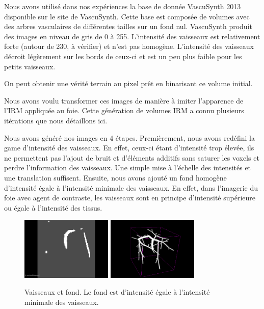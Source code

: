 Nous avons utilisé dans nos expériences la base de donnée VascuSynth 2013 disponible sur le site de VascuSynth. Cette base est composée de volumes avec des arbres vasculaires de différentes tailles sur un fond nul. VascuSynth produit des images en niveau de gris de 0 à 255. L'intensité des vaisseaux est relativement forte (autour de 230, à vérifier) et n'est pas homogène. L'intensité des vaisseaux décroit légèrement sur les bords de ceux-ci et est un peu plus faible pour les petits vaisseaux.

On peut obtenir une vérité terrain au pixel prêt en binarisant ce volume initial.

Nous avons voulu transformer ces images de manière à imiter l'apparence de l'IRM appliquée au foie. Cette génération de volumes IRM a connu plusieurs itérations que nous détaillons ici.

Nous avons généré nos images en 4 étapes.
Premièrement, nous avons redéfini la game d'intensité des vaisseaux. En effet, ceux-ci étant d'intensité trop élevée, ils ne permettent pas l'ajout de bruit et d'éléments additifs sans saturer les voxels et perdre l'information des vaisseaux. Une simple mise à l'échelle des intensités et une translation suffisent. Ensuite, nous avons ajouté un fond homogène d'intensité égale à l'intensité minimale des vaisseaux. En effet, dans l'imagerie du foie avec agent de contraste, les vaisseaux sont en principe d'intensité supérieure ou égale à l'intensité des tissus.

\begin{figure}
  \centering
  \includegraphics[height=3cm]{Images/2D_VB.png}
  \includegraphics[height=3cm]{Images/3D_VB.png}
  \label{fig:VB}
  \caption{Vaisseaux et fond. Le fond est d'intensité égale à l'intensité minimale des vaisseaux.}
\end{figure}

